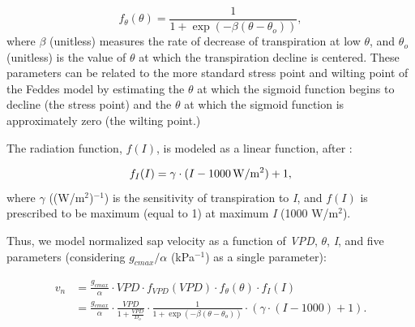\begin{equation}  %
f_{\theta}(\theta) = \frac{1}{1+\exp(-\beta(\theta-\theta_o))},
\end{equation}
where $\beta$ (unitless) measures the rate of decrease of transpiration at low $\theta$, and $\theta_o$ (unitless) is the value of $\theta$ at which the transpiration decline is centered.  These parameters can be related to the more standard stress point and wilting point of the Feddes model by estimating the $\theta$ at which the sigmoid function begins to decline (the stress point) and the $\theta$ at which the sigmoid function is approximately zero (the wilting point.)

The radiation function, $f(I)$, is modeled as a linear function, after \cite{waring2011generalizing}:

\begin{equation}  %
f_I(I) = \gamma \cdot (I-1000 \, {\rm W/m^2})+1,
\end{equation}
where $\gamma$ ((W/m$^2$)$^{-1}$) is the sensitivity of transpiration to \textit{I}, and $f(I)$ is prescribed to be maximum (equal to 1) at maximum \textit{I} (1000 W/m$^2$).

Thus, we model normalized sap velocity as a function of \textit{VPD}, $\theta$, \textit{I}, and five parameters (considering $g_{cmax}/\alpha$ (kPa$^{-1}$) as a single parameter):

\begin{align}
\label{eqn:sapflow_jarvis}
v_n & =  \frac{g_{cmax}}{\alpha} \cdot VPD \cdot f_{VPD}(VPD) \cdot f_{\theta}(\theta) \cdot f_I(I) \nonumber \\ 
& =  \frac{g_{cmax}}{\alpha} \cdot \frac{VPD}{1+\frac{VPD}{D_o}} \cdot \frac{1}{1+\exp(-\beta(\theta-\theta_o))} \cdot (\gamma \cdot (I-1000)+1).
\end{align}

